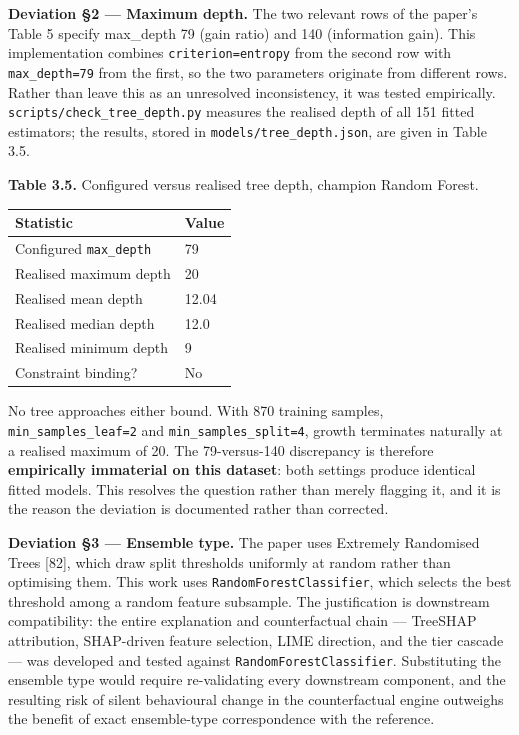 \textbf{Deviation §2 --- Maximum depth.} The two relevant rows of the paper's Table 5 specify max\_depth 79 (gain ratio) and 140 (information gain). This implementation combines \texttt{criterion=\textquotesingle{}entropy\textquotesingle{}} from the second row with \texttt{max\_depth=79} from the first, so the two parameters originate from different rows. Rather than leave this as an unresolved inconsistency, it was tested empirically. \texttt{scripts/check\_tree\_depth.py} measures the realised depth of all 151 fitted estimators; the results, stored in \texttt{models/tree\_depth.json}, are given in Table 3.5.

\textbf{Table 3.5.} Configured versus realised tree depth, champion Random Forest.

\begin{longtable}[]{@{}ll@{}}
\toprule\noalign{}
Statistic & Value \\
\midrule\noalign{}
\endhead
\bottomrule\noalign{}
\endlastfoot
Configured \texttt{max\_depth} & 79 \\
Realised maximum depth & 20 \\
Realised mean depth & 12.04 \\
Realised median depth & 12.0 \\
Realised minimum depth & 9 \\
Constraint binding? & No \\
\end{longtable}

No tree approaches either bound. With 870 training samples, \texttt{min\_samples\_leaf=2} and \texttt{min\_samples\_split=4}, growth terminates naturally at a realised maximum of 20. The 79-versus-140 discrepancy is therefore \textbf{empirically immaterial on this dataset}: both settings produce identical fitted models. This resolves the question rather than merely flagging it, and it is the reason the deviation is documented rather than corrected.

\textbf{Deviation §3 --- Ensemble type.} The paper uses Extremely Randomised Trees {[}82{]}, which draw split thresholds uniformly at random rather than optimising them. This work uses \texttt{RandomForestClassifier}, which selects the best threshold among a random feature subsample. The justification is downstream compatibility: the entire explanation and counterfactual chain --- TreeSHAP attribution, SHAP-driven feature selection, LIME direction, and the tier cascade --- was developed and tested against \texttt{RandomForestClassifier}. Substituting the ensemble type would require re-validating every downstream component, and the resulting risk of silent behavioural change in the counterfactual engine outweighs the benefit of exact ensemble-type correspondence with the reference.

